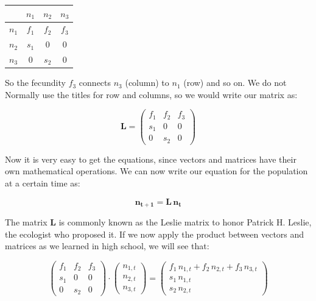 \documentclass[12pt]{article}
\begin{document}
\begin{center}
	\begin{tabular}{c|ccc}
		& $n_1$ & $n_2$ & $n_3$ \\
		\hline
		$n_1$ &$f_1$	&$f_2$	&$f_3$	\\
		$n_2$ &$s_1$	&0	&0	\\
		$n_3$ &0	&$s_2$	&0	\\
	\end{tabular}
\end{center}

So the fecundity $f_3$ connects $n_3$ (column) to $n_1$ (row) and so on. We do not Normally use the titles for row and columns, so we would write our matrix as:

\begin{equation}
\mathbf{L} =	\begin{pmatrix}
		f_1	&f_2	&f_3	\\
		s_1	&0	&0	\\
		0	&s_2	&0
	\end{pmatrix}
\end{equation}

Now it is very easy to get the equations, since vectors and matrices have their own mathematical operations. We can now write our equation for the population at a certain time as:

\begin{equation}
	\mathbf{n_{t+1}} =\mathbf{L} \, \mathbf{n_t}
	\label{fig:matequationL}
\end{equation}

The matrix $\mathbf{L}$ is commonly known as the Leslie matrix to honor Patrick H. Leslie, the ecologist who proposed it. If we now apply the product between vectors and matrices as we learned in high school, we will see that:

\begin{equation}
	 	\begin{pmatrix}
		f_1	&f_2	&f_3	\\
		s_1	&0	&0	\\
		0	&s_2	&0
	\end{pmatrix} \cdot \begin{pmatrix} n_{1,t}\\ n_{2,t} \\ n_{3,t}\end{pmatrix} = \begin{pmatrix} f_1 \,n_{1,t} + f_2 \,n_{2,t} + f_3 \,n_{3,t}\\ s_1 \, n_{1,t} \\ s_2 \, n_{2,t}\end{pmatrix}
\end{equation}
\end{document}
